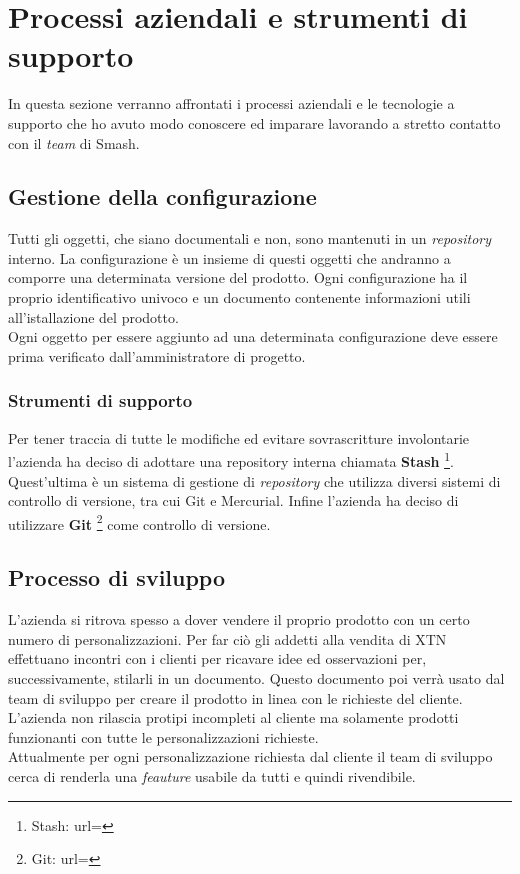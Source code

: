 \section{Processi aziendali e strumenti di supporto}
In questa sezione verranno affrontati i processi aziendali e le tecnologie a supporto che ho avuto modo conoscere ed imparare lavorando a stretto contatto con il \textit{team} di Smash\textregistered.

\subsection{Gestione della configurazione}
Tutti gli oggetti, che siano documentali e non, sono mantenuti in un \textit{repository} interno. La configurazione è un insieme di questi oggetti che andranno a comporre una determinata versione del prodotto. Ogni configurazione ha il proprio identificativo univoco e un documento contenente informazioni utili all'istallazione del prodotto.\\
Ogni oggetto per essere aggiunto ad una determinata configurazione deve essere prima verificato dall'amministratore di progetto.
\subsubsection{Strumenti di supporto}
Per tener traccia di tutte le modifiche ed evitare sovrascritture involontarie l'azienda ha deciso di adottare una repository interna chiamata \textbf{Stash} \footnote{Stash: url= }. Quest'ultima è un sistema di gestione di \textit{repository} che utilizza diversi sistemi di controllo di versione, tra cui Git e Mercurial. Infine l'azienda ha deciso di utilizzare \textbf{Git} \footnote{Git: url= } come controllo di versione.
\subsection{Processo di sviluppo}
L'azienda si ritrova spesso a dover vendere il proprio prodotto con un certo numero di personalizzazioni. Per far ciò gli addetti alla vendita di XTN effettuano incontri con i clienti per ricavare idee ed osservazioni per, successivamente, stilarli in un documento. Questo documento poi verrà usato dal team di sviluppo per creare il prodotto in linea con le richieste del cliente.\\
L'azienda non rilascia protipi incompleti al cliente ma solamente prodotti funzionanti con tutte le personalizzazioni richieste.\\
Attualmente per ogni personalizzazione richiesta dal cliente il team di sviluppo cerca di renderla una \textit{feauture} usabile da tutti e quindi rivendibile.
